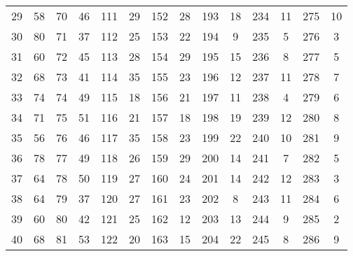 \begin{table}[H]
\begin{tabular}{S S | S S | S S | S S | S S | S S | S S}
        29  &   58  &  70  &   46  &  111 &   29  &  152 &   28  &  193 &   18  &   234 &   11  &  275 &   10  \\
        30  &   80  &  71  &   37  &  112 &   25  &  153 &   22  &  194 &    9  &   235 &    5  &  276 &    3  \\
        31  &   60  &  72  &   45  &  113 &   28  &  154 &   29  &  195 &   15  &   236 &    8  &  277 &    5  \\
        32  &   68  &  73  &   41  &  114 &   35  &  155 &   23  &  196 &   12  &   237 &   11  &  278 &    7  \\
        33  &   74  &  74  &   49  &  115 &   18  &  156 &   21  &  197 &   11  &   238 &    4  &  279 &    6  \\
        34  &   71  &  75  &   51  &  116 &   21  &  157 &   18  &  198 &   19  &   239 &   12  &  280 &    8  \\
        35  &   56  &  76  &   46  &  117 &   35  &  158 &   23  &  199 &   22  &   240 &   10  &  281 &    9  \\
        36  &   78  &  77  &   49  &  118 &   26  &  159 &   29  &  200 &   14  &   241 &    7  &  282 &    5  \\
        37  &   64  &  78  &   50  &  119 &   27  &  160 &   24  &  201 &   14  &   242 &   12  &  283 &    3  \\
        38  &   64  &  79  &   37  &  120 &   27  &  161 &   23  &  202 &    8  &   243 &   11  &  284 &    6  \\
        39  &   60  &  80  &   42  &  121 &   25  &  162 &   12  &  203 &   13  &   244 &    9  &  285 &    2  \\
        40  &   68  &  81  &   53  &  122 &   20  &  163 &   15  &  204 &   22  &   245 &    8  &  286 &    9  \\
        \bottomrule
      \end{tabular}
    \end{table}
